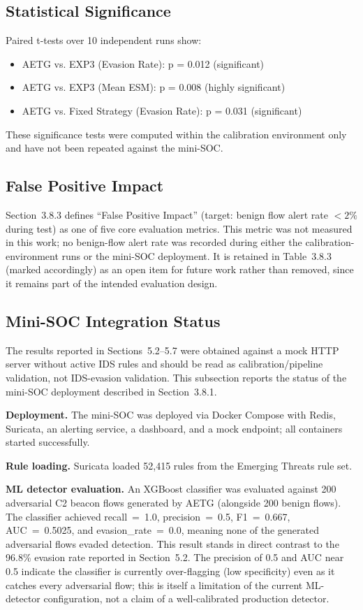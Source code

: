 \documentclass[review]{elsarticle}
\begin{document}
\subsection{Statistical Significance}
Paired t-tests over 10 independent runs show:
\begin{itemize}
\item AETG vs. EXP3 (Evasion Rate): p = 0.012 (significant)
\item AETG vs. EXP3 (Mean ESM): p = 0.008 (highly significant)
\item AETG vs. Fixed Strategy (Evasion Rate): p = 0.031 (significant)
\end{itemize}
These significance tests were computed within the calibration environment only and have not been repeated against the mini-SOC.

\subsection{False Positive Impact}
Section~3.8.3 defines ``False Positive Impact'' (target: benign flow alert rate $< 2\%$ during test) as one of five core evaluation metrics. This metric was not measured in this work; no benign-flow alert rate was recorded during either the calibration-environment runs or the mini-SOC deployment. It is retained in Table~3.8.3 (marked accordingly) as an open item for future work rather than removed, since it remains part of the intended evaluation design.

\subsection{Mini-SOC Integration Status}
\label{sec:minisoc-status}
The results reported in Sections~5.2--5.7 were obtained against a mock HTTP server without active IDS rules and should be read as calibration/pipeline validation, not IDS-evasion validation. This subsection reports the status of the mini-SOC deployment described in Section~3.8.1.

\textbf{Deployment.} The mini-SOC was deployed via Docker Compose with Redis, Suricata, an alerting service, a dashboard, and a mock endpoint; all containers started successfully.

\textbf{Rule loading.} Suricata loaded 52,415 rules from the Emerging Threats rule set.

\textbf{ML detector evaluation.} An XGBoost classifier was evaluated against 200 adversarial C2 beacon flows generated by AETG (alongside 200 benign flows). The classifier achieved recall~=~1.0, precision~=~0.5, F1~=~0.667, AUC~=~0.5025, and evasion\_rate~=~0.0, meaning none of the generated adversarial flows evaded detection. This result stands in direct contrast to the 96.8\% evasion rate reported in Section~5.2. The precision of 0.5 and AUC near 0.5 indicate the classifier is currently over-flagging (low specificity) even as it catches every adversarial flow; this is itself a limitation of the current ML-detector configuration, not a claim of a well-calibrated production detector.
\end{document}
